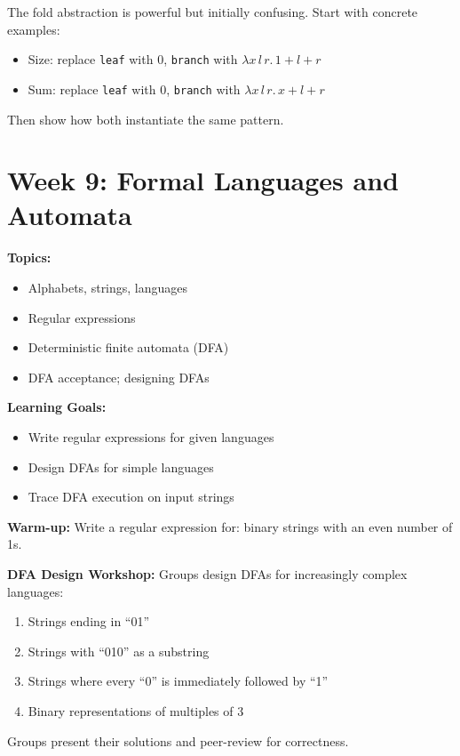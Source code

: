 \documentclass[11pt]{article}
\begin{document}
\begin{tipbox}
The fold abstraction is powerful but initially confusing. Start with concrete examples:
\begin{itemize}
    \item Size: replace \texttt{leaf} with 0, \texttt{branch} with $\lambda x\, l\, r.\, 1 + l + r$
    \item Sum: replace \texttt{leaf} with 0, \texttt{branch} with $\lambda x\, l\, r.\, x + l + r$
\end{itemize}
Then show how both instantiate the same pattern.
\end{tipbox}

\newpage
\section{Week 9: Formal Languages and Automata}

\begin{classabox}
\textbf{Topics:}
\begin{itemize}
    \item Alphabets, strings, languages
    \item Regular expressions
    \item Deterministic finite automata (DFA)
    \item DFA acceptance; designing DFAs
\end{itemize}

\textbf{Learning Goals:}
\begin{itemize}
    \item Write regular expressions for given languages
    \item Design DFAs for simple languages
    \item Trace DFA execution on input strings
\end{itemize}

\textbf{Warm-up:} Write a regular expression for: binary strings with an even number of 1s.
\end{classabox}

\begin{activitybox}
\textbf{DFA Design Workshop:} Groups design DFAs for increasingly complex languages:
\begin{enumerate}
    \item Strings ending in ``01''
    \item Strings with ``010'' as a substring
    \item Strings where every ``0'' is immediately followed by ``1''
    \item Binary representations of multiples of 3
\end{enumerate}
Groups present their solutions and peer-review for correctness.
\end{activitybox}
\end{document}
